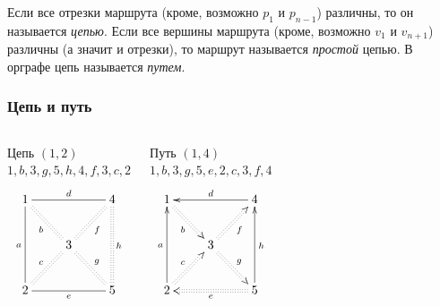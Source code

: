 Если все отрезки маршрута (кроме, возможно $p_1$ и $p_{n-1}$) различны, то он называется \emph{цепью}. Если все вершины маршрута (кроме, возможно $v_1$ и $v_{n+1}$) различны (а значит и отрезки), то маршрут называется \emph{простой} цепью. В орграфе цепь называется \emph{путем}.

\begin{frame}
    \frametitle{Цепь и путь}

    \begin{columns}
            \begin{block}{Цепь $(1,2)$\\$1,b,3,g,5,h,4,f,3,c,2$}
                \[
                    {\xymatrix{
                        1 \ar@{-}[dd]_{a} \ar@{-}[rr]^{d} \ar@{:}[dr]_{b}
                            &*{}
                                &4 \ar@{:}[dd]^{h}
                                    \\
                        *{} 
                            &3 \ar@{:}[ur]_{f} \ar@{:}[dr]^{g}
                                &*{}
                                    \\
                        2  \ar@{:}[ur]^{c} \ar@{-}[rr]_{e}
                            &*{}
                                &5
                    }}
                \]
            \end{block}
        
            \begin{block}{Путь $(1,4)$\\$1,b,3,g,5,e,2,c,3,f,4$}
                \[
                    {\xymatrix{
                        1 \ar@{<-}[dd]_{a} \ar@{<-}[rr]^{d} \ar@{:>}[dr]_{b}
                            &*{}
                                &4 \ar@{<-}[dd]^{h}
                                    \\
                        *{} 
                            &3 \ar@{:>}[ur]_{f} \ar@{:>}[dr]^{g}
                                &*{}
                                    \\
                        2  \ar@{:>}[ur]^{c} \ar@{<:}[rr]_{e}
                            &*{}
                                &5
                    }}
                \]
            \end{block}
    \end{columns}    
\end{frame}

